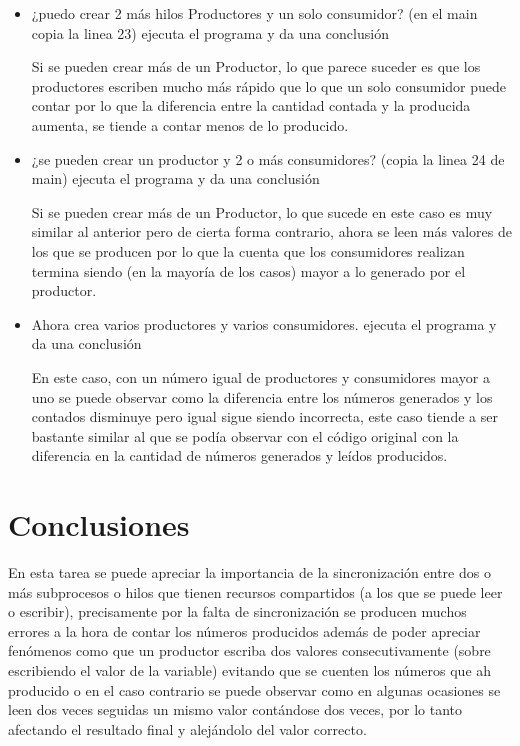 \documentclass[12pt]{article}
\begin{document}
\begin{itemize}
\item ¿puedo crear 2 más hilos Productores y un solo consumidor? (en
  el main copia la linea 23) ejecuta el programa y da una conclusión

  Si se pueden crear más de un Productor, lo que parece suceder es que
  los productores escriben mucho más rápido que lo que un solo
  consumidor puede contar por lo que la diferencia entre la cantidad
  contada y la producida aumenta, se tiende a contar menos de lo
  producido.

\item ¿se pueden crear un productor y 2 o más consumidores? (copia la
  linea 24 de main) ejecuta el programa y da una conclusión

  Si se pueden crear más de un Productor, lo que sucede en este caso
  es muy similar al anterior pero de cierta forma contrario, ahora se
  leen más valores de los que se producen por lo que la cuenta que los
  consumidores realizan termina siendo (en la mayoría de los casos)
  mayor a lo generado por el productor.

\item Ahora crea varios productores y varios consumidores. ejecuta el
  programa y da una conclusión

  En este caso, con un número igual de productores y consumidores
  mayor a uno se puede observar como la diferencia entre los números
  generados y los contados disminuye pero igual sigue siendo
  incorrecta, este caso tiende a ser bastante similar al que se podía
  observar con el código original con la diferencia en la cantidad de
  números generados y leídos producidos.

\end{itemize}

\section*{Conclusiones}

En esta tarea se puede apreciar la importancia de la sincronización
entre dos o más subprocesos o hilos que tienen recursos compartidos (a
los que se puede leer o escribir), precisamente por la falta de
sincronización se producen muchos errores a la hora de contar los
números producidos además de poder apreciar fenómenos como que un
productor escriba dos valores consecutivamente (sobre escribiendo el
valor de la variable) evitando que se cuenten los números que ah
producido o en el caso contrario se puede observar como en algunas
ocasiones se leen dos veces seguidas un mismo valor contándose dos
veces, por lo tanto afectando el resultado final y alejándolo del
valor correcto.
\end{document}
